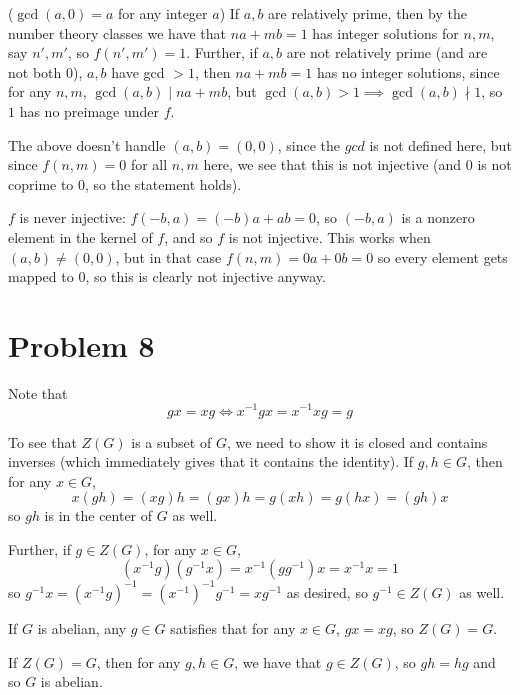 \documentclass[12pt,letterpaper]{article}
\theoremstyle{definition}
\begin{document}
($\gcd(a,0) = a$ for any integer $a$) If $a,b$ are relatively prime, then by the number theory classes we have that $na + mb = 1$ has integer solutions for $n,m$, say $n',m'$, so $f(n',m') = 1$. Further, if $a,b$ are not relatively prime (and are not both 0), $a,b$ have gcd $> 1$, then $na + mb = 1$ has no integer solutions, since for any $n,m$, $\gcd(a,b) \mid na + mb$, but $\gcd(a,b) > 1 \implies \gcd(a,b) \nmid 1$, so $1$ has no preimage under $f$.

The above doesn't handle $(a,b) = (0,0)$, since the $gcd$ is not defined here, but since $f(n,m) = 0$ for all $n,m$ here, we see that this is not injective (and $0$ is not coprime to $0$, so the statement holds).

$f$ is never injective: $f(-b, a) = (-b)a + ab = 0$, so $(-b,a)$ is a nonzero element in the kernel of $f$, and so $f$ is not injective. This works when $(a,b) \neq (0,0)$, but in that case $f(n,m) = 0a + 0b = 0$ so every element gets mapped to 0, so this is clearly not injective anyway.

\section*{Problem 8}

Note that
\[
  gx = xg \iff x^{-1}gx = x^{-1}xg = g
\]

To see that $Z(G)$ is a subset of $G$, we need to show it is closed and contains inverses (which immediately gives that it contains the identity). If $g,h \in G$, then for any $x \in G$,
\[
  x(gh) = (xg)h = (gx)h = g(xh) = g(hx) = (gh)x
\]
so $gh$ is in the center of $G$ as well.

Further, if $g \in Z(G)$, for any $x \in G$,
\[
  (x^{-1}g)(g^{-1}x) = x^{-1}(gg^{-1})x = x^{-1}x = 1
\]
so $g^{-1}x = (x^{-1}g)^{-1} = (x^{-1})^{-1}g^{-1} = xg^{-1}$ as desired, so $g^{-1} \in Z(G)$ as well.

If $G$ is abelian, any $g \in G$ satisfies that for any $x \in G$, $gx = xg$, so $Z(G) = G$.

If $Z(G) = G$, then for any $g,h \in G$, we have that $g \in Z(G)$, so $gh = hg$ and so $G$ is abelian.
\end{document}
